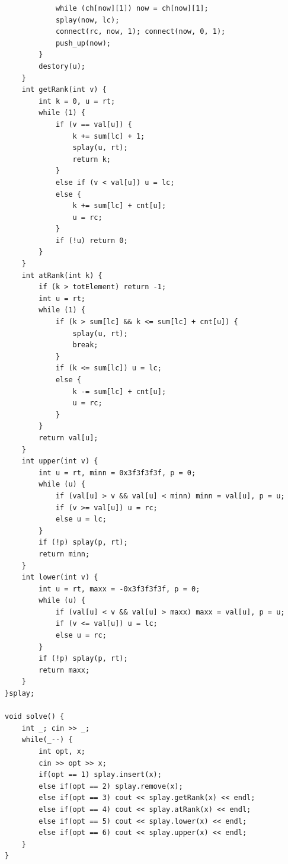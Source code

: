 \documentclass[twoside]{article}
\begin{document}
\begin{lstlisting}
            while (ch[now][1]) now = ch[now][1];
            splay(now, lc);
            connect(rc, now, 1); connect(now, 0, 1);
            push_up(now);
        }
        destory(u);
    }
    int getRank(int v) {
        int k = 0, u = rt;
        while (1) {
            if (v == val[u]) {
                k += sum[lc] + 1;
                splay(u, rt);
                return k;
            }
            else if (v < val[u]) u = lc;
            else {
                k += sum[lc] + cnt[u];
                u = rc;
            }
            if (!u) return 0;
        }
    }
    int atRank(int k) {
        if (k > totElement) return -1;
        int u = rt;
        while (1) {
            if (k > sum[lc] && k <= sum[lc] + cnt[u]) {
                splay(u, rt);
                break;
            }
            if (k <= sum[lc]) u = lc;
            else {
                k -= sum[lc] + cnt[u];
                u = rc;
            }
        }
        return val[u];
    }
    int upper(int v) {
        int u = rt, minn = 0x3f3f3f3f, p = 0;
        while (u) {
            if (val[u] > v && val[u] < minn) minn = val[u], p = u;
            if (v >= val[u]) u = rc;
            else u = lc;
        }
        if (!p) splay(p, rt);
        return minn;
    }
    int lower(int v) {
        int u = rt, maxx = -0x3f3f3f3f, p = 0;
        while (u) {
            if (val[u] < v && val[u] > maxx) maxx = val[u], p = u;
            if (v <= val[u]) u = lc;
            else u = rc;
        }
        if (!p) splay(p, rt);
        return maxx;
    }
}splay;

void solve() {
    int _; cin >> _;
    while(_--) {
        int opt, x;
        cin >> opt >> x;
        if(opt == 1) splay.insert(x);
        else if(opt == 2) splay.remove(x);
        else if(opt == 3) cout << splay.getRank(x) << endl;
        else if(opt == 4) cout << splay.atRank(x) << endl;
        else if(opt == 5) cout << splay.lower(x) << endl;
        else if(opt == 6) cout << splay.upper(x) << endl;
    }
}\end{lstlisting}
\end{document}
